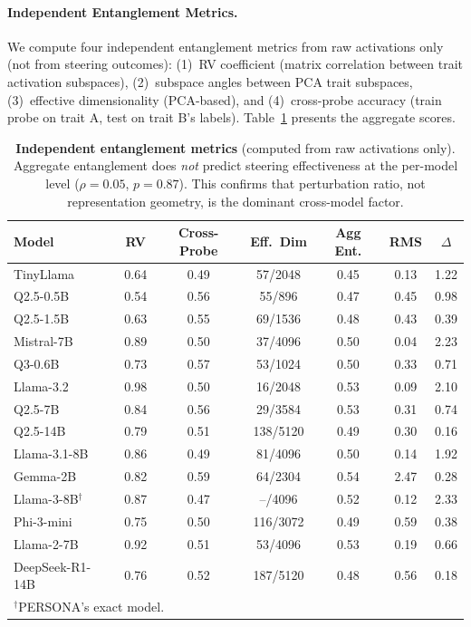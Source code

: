 \documentclass{article}
\begin{document}
\paragraph{Independent Entanglement Metrics.} We compute four independent entanglement metrics from raw activations only (not from steering outcomes): (1)~RV coefficient (matrix correlation between trait activation subspaces), (2)~subspace angles between PCA trait subspaces, (3)~effective dimensionality (PCA-based), and (4)~cross-probe accuracy (train probe on trait A, test on trait B's labels). Table~\ref{tab:entanglement_independent} presents the aggregate scores.

\begin{table}[h]
\caption{\textbf{Independent entanglement metrics} (computed from raw activations only). Aggregate entanglement does \emph{not} predict steering effectiveness at the per-model level ($\rho{=}0.05$, $p{=}0.87$). This confirms that perturbation ratio, not representation geometry, is the dominant cross-model factor.}
\label{tab:entanglement_independent}
\centering
\small
\begin{tabular}{lccccc|c}
\toprule
\textbf{Model} & \textbf{RV} & \textbf{Cross-Probe} & \textbf{Eff.\ Dim} & \textbf{Agg Ent.} & \textbf{RMS} & $\Delta$ \\
\midrule
TinyLlama & 0.64 & 0.49 & 57/2048 & 0.45 & 0.13 & 1.22 \\
Q2.5-0.5B & 0.54 & 0.56 & 55/896 & 0.47 & 0.45 & 0.98 \\
Q2.5-1.5B & 0.63 & 0.55 & 69/1536 & 0.48 & 0.43 & 0.39 \\
Mistral-7B & 0.89 & 0.50 & 37/4096 & 0.50 & 0.04 & 2.23 \\
Q3-0.6B & 0.73 & 0.57 & 53/1024 & 0.50 & 0.33 & 0.71 \\
Llama-3.2 & 0.98 & 0.50 & 16/2048 & 0.53 & 0.09 & 2.10 \\
Q2.5-7B & 0.84 & 0.56 & 29/3584 & 0.53 & 0.31 & 0.74 \\
Q2.5-14B & 0.79 & 0.51 & 138/5120 & 0.49 & 0.30 & 0.16 \\
Llama-3.1-8B & 0.86 & 0.49 & 81/4096 & 0.50 & 0.14 & 1.92 \\
Gemma-2B & 0.82 & 0.59 & 64/2304 & 0.54 & 2.47 & 0.28 \\
Llama-3-8B$^\dagger$ & 0.87 & 0.47 & --/4096 & 0.52 & 0.12 & 2.33 \\
Phi-3-mini & 0.75 & 0.50 & 116/3072 & 0.49 & 0.59 & 0.38 \\
Llama-2-7B & 0.92 & 0.51 & 53/4096 & 0.53 & 0.19 & 0.66 \\
DeepSeek-R1-14B & 0.76 & 0.52 & 187/5120 & 0.48 & 0.56 & 0.18 \\
\bottomrule
\multicolumn{7}{l}{\footnotesize $^\dagger$PERSONA's exact model.}
\end{tabular}
\end{table}
\end{document}
